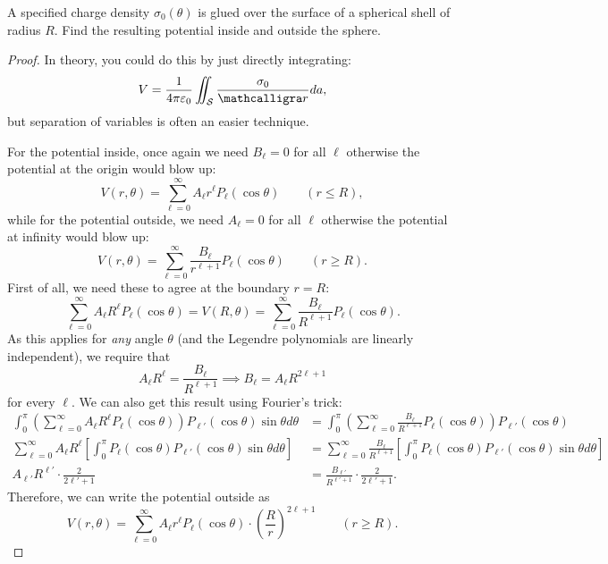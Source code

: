 \begin{example}\label{chargespherepotential}
A specified charge density $\sigma_0(\theta)$ is glued over the surface of a spherical shell of radius $R$. Find the resulting potential inside and outside the sphere.
\end{example}

\begin{proof}
In theory, you could do this by just directly integrating:
\[V=\frac{1}{4\pi\varepsilon_0}\iint_{\mathcal{S}}\frac{\sigma_0}{\scr}da,\]
but separation of variables is often an easier technique.

For the potential inside, once again we need $B_\ell=0$ for all $\ell$ otherwise the potential at the origin would blow up:
\[V(r,\theta)=\sum_{\ell=0}^\infty A_\ell r^\ell P_\ell(\cos\theta)\qquad (r\le R),\]
while for the potential outside, we need $A_\ell=0$ for all $\ell$ otherwise the potential at infinity would blow up:
\[V(r,\theta)=\sum_{\ell=0}^\infty \frac{B_{\ell}}{r^{\ell+1}}P_\ell(\cos\theta)\qquad (r\ge R).\]
First of all, we need these to agree at the boundary $r=R$:
\[\sum_{\ell=0}^\infty A_\ell R^\ell P_\ell(\cos\theta)=V(R,\theta)=\sum_{\ell=0}^\infty \frac{B_\ell}{R^{\ell+1}}P_\ell(\cos\theta).\]
As this applies for \textit{any} angle $\theta$ (and the Legendre polynomials are linearly independent), we require that
\[A_\ell R^\ell=\frac{B_\ell}{R^{\ell+1}}\implies B_\ell=A_\ell R^{2\ell+1}\]
for every $\ell$. We can also get this result using Fourier's trick:
\begin{align*}
\int_0^\pi \left(\sum_{\ell=0}^\infty A_\ell R^\ell P_\ell(\cos\theta)\right)P_{\ell'}(\cos\theta)\sin\theta d\theta &= \int_0^\pi\left(\sum_{\ell=0}^\infty \frac{B_\ell}{R^{\ell+1}}P_\ell(\cos\theta)\right)P_{\ell'}(\cos\theta)\\
\sum_{\ell=0}^\infty A_\ell R^\ell \left[\int_0^\pi P_\ell(\cos\theta)P_{\ell'}(\cos\theta)\sin\theta d\theta\right]&=\sum_{\ell=0}^\infty \frac{B_\ell}{R^{\ell+1}}\left[\int_0^\pi P_{\ell}(\cos\theta)P_{\ell'}(\cos\theta)\sin\theta d\theta\right]\\
A_{\ell'}R^{\ell'}\cdot\frac{2}{2\ell'+1}&=\frac{B_{\ell'}}{R^{\ell'+1}}\cdot \frac{2}{2\ell'+1}.
\end{align*}
Therefore, we can write the potential outside as
\[V(r,\theta)=\sum_{\ell=0}^\infty A_\ell r^\ell P_\ell(\cos\theta)\cdot \left(\frac{R}{r}\right)^{2\ell+1}\qquad (r\ge R).\]


\end{proof}
